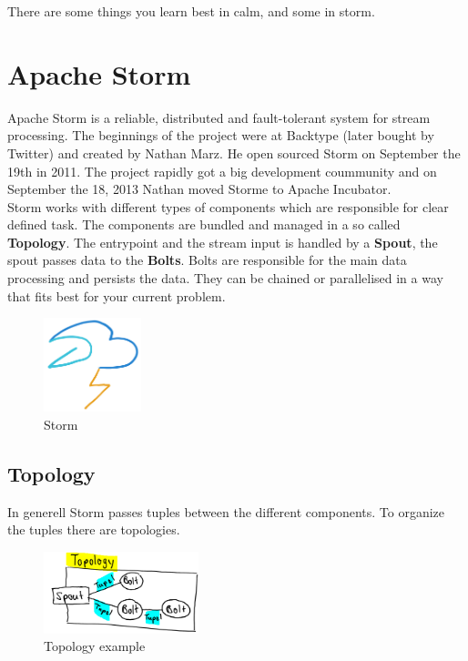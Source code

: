 \begin{savequote}[75mm]
There are some things you learn best in calm, and some in storm.
\end{savequote}

\chapter{Apache Storm}

Apache Storm is a reliable, distributed and fault-tolerant system for stream processing.
The beginnings of the project were at Backtype (later bought by Twitter) and created by Nathan Marz.
He open sourced Storm on September the 19th in 2011. The project rapidly got a big development coummunity and
on September the 18, 2013 Nathan moved Storme to Apache Incubator.\\

Storm works with different types of components which are responsible for clear defined task.
The components are bundled and managed in a so called \textbf{Topology}.
The entrypoint and the stream input is handled by a \textbf{Spout}, the spout passes data to the \textbf{Bolts}.
Bolts are responsible for the main data processing and persists the data.
They can be chained or parallelised in a way that fits best for your current problem.

\begin{figure}[H]
\centering
\captionsetup{justification=centering}
\includegraphics[width=80pt]{images/storm.png}
\caption[Storm]{Storm}
\end{figure}

\newpage

\section{Topology}
In generell Storm passes tuples between the different components.
To organize the tuples there are topologies.
\begin{figure}[H]
\centering
\captionsetup{justification=centering}
\includegraphics[width=0.4\textwidth]{images/topology_example.png}
\caption[Topology example]{Topology example}
\end{figure}

